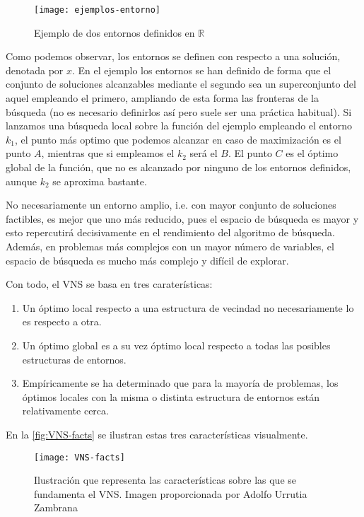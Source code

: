 \begin{figure}[htbp]
	\centering
	\texttt{[image: ejemplos-entorno]}
	\caption{Ejemplo de dos entornos definidos en $\mathbb{R}$}
	\label{fig:ejemplos-entorno}
\end{figure}

Como podemos observar, los entornos se definen con respecto a una solución, denotada por $x$. En el ejemplo los entornos se han definido de forma que el conjunto de soluciones alcanzables mediante el segundo sea un superconjunto del aquel empleando el primero, ampliando de esta forma las fronteras de la búsqueda (no es necesario definirlos así pero suele ser una práctica habitual). Si lanzamos una búsqueda local sobre la función del ejemplo empleando el entorno $k_1$, el punto más optimo que podemos alcanzar en caso de maximización es el punto $A$, mientras que si empleamos el $k_2$ será el $B$. El punto $C$ es el óptimo global de la función, que no es alcanzado por ninguno de los entornos definidos, aunque $k_2$ se aproxima bastante. 

No necesariamente un entorno amplio, i.e. con mayor conjunto de soluciones factibles, es mejor que uno más reducido, pues el espacio de búsqueda es mayor y esto repercutirá decisivamente en el rendimiento del algoritmo de búsqueda. Además, en problemas más complejos con un mayor número de variables, el espacio de búsqueda es mucho más complejo y difícil de explorar.

Con todo, el VNS se basa en tres caraterísticas:

\begin{enumerate}
	\item Un óptimo local respecto a una estructura de vecindad no necesariamente lo es respecto a otra.
	\item Un óptimo global es a su vez óptimo local respecto a todas las posibles estructuras de entornos.
	\item Empíricamente se ha determinado que para la mayoría de problemas, los óptimos locales con la misma o distinta estructura de entornos están relativamente cerca.
\end{enumerate}

En la \autoref{fig:VNS-facts} se ilustran estas tres características visualmente.

\begin{figure}[htbp]
	\centering
	\texttt{[image: VNS-facts]}
	\caption[Ilustración que representa las características sobre las que se fundamenta el VNS]{Ilustración que representa las características sobre las que se fundamenta el VNS. Imagen proporcionada por Adolfo Urrutia Zambrana}
	\label{fig:VNS-facts}
\end{figure}


